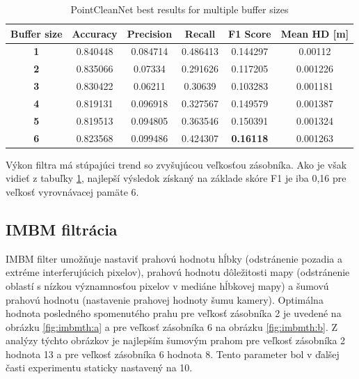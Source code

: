 \begin{table}[h]
	\caption{\label{tab:pcn_best} PointCleanNet best results for multiple buffer sizes }
	\centering
	\begin{tabular}{cccccc}
		\toprule
		\textbf{Buffer size} & \textbf{Accuracy} & \textbf{Precision} & \textbf{Recall} & \textbf{F1 Score} & \textbf{Mean HD [m]} \\ 
		\midrule
		\textbf{1}           & 0.840448          & 0.084714           & 0.486413        & 0.144297          & 0.00112                         \\ 
		\textbf{2}           & 0.835066          & 0.07334            & 0.291626        & 0.117205          & 0.001226                        \\ 
		\textbf{3}           & 0.830422          & 0.06211            & 0.30639         & 0.103283          & 0.001181                        \\ 
		\textbf{4}           & 0.819131          & 0.096918           & 0.327567        & 0.149579          & 0.001387                        \\ 
		\textbf{5}           & 0.819513          & 0.094805           & 0.363546        & 0.150391          & 0.001324                        \\ 
		\textbf{6}           & 0.823568          & 0.099486           & 0.424307        & \textbf{0.16118}           & 0.001263                        \\ 
		\bottomrule
	\end{tabular}
\end{table}

Výkon filtra má stúpajúci trend so zvyšujúcou veľkosťou zásobníka. Ako je však vidieť z tabuľky \ref{tab:pcn_best}, najlepší výsledok získaný na základe skóre F1 je iba 0,16 pre veľkosť vyrovnávacej pamäte 6.

\subsection{IMBM filtrácia}
\label{sec:imbm:filtration}

IMBM filter umožňuje nastaviť prahovú hodnotu hĺbky (odstránenie pozadia a extréme interferujúcich pixelov), prahovú hodnotu dôležitosti mapy (odstránenie oblastí s nízkou významnosťou pixelov v mediáne hĺbkovej mapy) a šumovú prahovú hodnotu (nastavenie prahovej hodnoty šumu kamery). Optimálna hodnota posledného spomenutého prahu pre veľkosť zásobníka 2 je uvedené na obrázku \ref{fig:imbmth:a} a pre veľkosť zásobníka 6 na obrázku \ref {fig:imbmth:b}. Z analýzy týchto obrázkov je najlepším šumovým prahom pre veľkosť zásobníka 2 hodnota 13 a pre veľkosť zásobníka 6 hodnota 8. Tento parameter bol v ďalšej časti experimentu staticky nastavený na 10.


